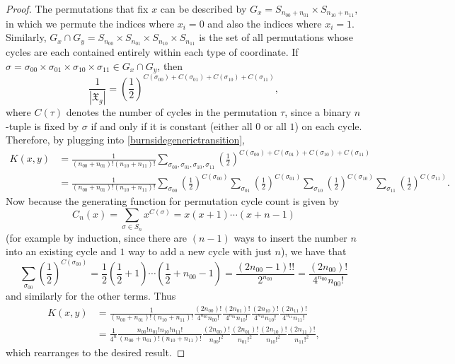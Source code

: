 \documentclass[10pt,a4paper]{amsart}
\newcommand{\mf}{\mathfrak}
\begin{document}
\begin{proof}
The permutations that fix $x$ can be described by $G_x = S_{n_{00} + n_{01}} \times S_{n_{10} + n_{11}}$, in which we permute the indices where $x_i = 0$ and also the indices where $x_i = 1$. Similarly, $G_x \cap G_y = S_{n_{00}} \times S_{n_{01}} \times S_{n_{10}} \times S_{n_{11}}$ is the set of all permutations whose cycles are each contained entirely within each type of coordinate. If $\sigma = \sigma_{00} \times \sigma_{01} \times \sigma_{10} \times \sigma_{11} \in G_x \cap G_y$, then
\[
    \frac{1}{|\mf{X}_g|} = \left(\frac{1}{2}\right)^{C(\sigma_{00}) + C(\sigma_{01}) + C(\sigma_{10}) + C(\sigma_{11})},
\]
where $C(\tau)$ denotes the number of cycles in the permutation $\tau$, since a binary $n$-tuple is fixed by $\sigma$ if and only if it is constant (either all $0$ or all $1$) on each cycle. Therefore, by plugging into \cref{burnsidegenerictransition},
\begin{align*}
    K(x, y) &= \frac{1}{(n_{00} + n_{01})! (n_{10} + n_{11})!} \sum_{\sigma_{00}, \sigma_{01}, \sigma_{10}, \sigma_{11}}\left(\frac{1}{2}\right)^{C(\sigma_{00}) + C(\sigma_{01}) + C(\sigma_{10}) + C(\sigma_{11})} \\
    &= \frac{1}{(n_{00} + n_{01})! (n_{10} + n_{11})!} \sum_{\sigma_{00}} \left(\frac{1}{2}\right)^{C(\sigma_{00})} \sum_{\sigma_{01}} \left(\frac{1}{2}\right)^{C(\sigma_{01})} \sum_{\sigma_{10}} \left(\frac{1}{2}\right)^{C(\sigma_{10})} \sum_{\sigma_{11}} \left(\frac{1}{2}\right)^{C(\sigma_{11})}.
\end{align*}
Now because the generating function for permutation cycle count is given by
\[
    C_n(x) = \sum_{\sigma \in S_n} x^{C(\sigma)} = x(x+1)\cdots(x+n-1)
\]
(for example by induction, since there are $(n-1)$ ways to insert the number $n$ into an existing cycle and $1$ way to add a new cycle with just $n$), we have that 
\[
    \sum_{\sigma_{00}} \left(\frac{1}{2}\right)^{C(\sigma_{00})} = \frac{1}{2} \left(\frac{1}{2} + 1\right) \cdots \left(\frac{1}{2} + n_{00} - 1\right) = \frac{(2n_{00}-1)!!}{2^{n_{00}}} = \frac{(2n_{00})!}{4^{n_{00}} n_{00}!}
\]  
and similarly for the other terms. Thus
\begin{align*}
K(x, y) &= \frac{1}{(n_{00} + n_{01})! (n_{10} + n_{11})!}  \frac{(2n_{00})!}{4^{n_{00}} n_{00}!} \frac{(2n_{01})!}{4^{n_{01}} n_{10}!} \frac{(2n_{10})!}{4^{n_{10}} n_{10}!} \frac{(2n_{11})!}{4^{n_{11}} n_{11}!} \\
&= \frac{1}{4^n} \frac{n_{00}! n_{01}! n_{10}! n_{11}!}{(n_{00} + n_{01})! (n_{10} + n_{11})!} \frac{(2n_{00})!}{n_{00}!^2} \frac{(2n_{01})!}{n_{01}!^2} \frac{(2n_{10})!}{n_{10}!^2} \frac{(2n_{11})!}{n_{11}!^2},
\end{align*}
which rearranges to the desired result.
\end{proof}
\end{document}
